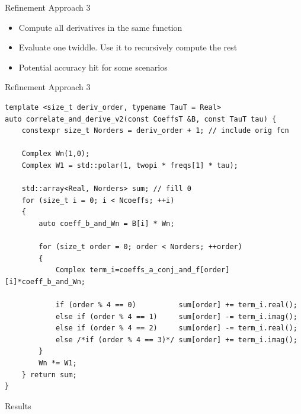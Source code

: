 \begin{frame}{Refinement Approach 3}
	\begin{itemize}
		\item Compute all derivatives in the same function
		\item Evaluate one twiddle. Use it to recursively compute the rest
		\item Potential accuracy hit for some scenarios 
	\end{itemize}
\end{frame}


\begin{frame}[fragile]{Refinement Approach 3}
	\begin{lstlisting}[basicstyle=\ttfamily\scriptsize, 
		linebackgroundcolor={%
			\ifnum\value{lstnumber}=5 \color{yellow!30}\fi
			\ifnum\value{lstnumber}=6 \color{yellow!30}\fi
			\ifnum\value{lstnumber}=15 \color{yellow!30}\fi
			\ifnum\value{lstnumber}=22 \color{yellow!30}\fi
		}]
template <size_t deriv_order, typename TauT = Real>
auto correlate_and_derive_v2(const CoeffsT &B, const TauT tau) {
	constexpr size_t Norders = deriv_order + 1; // include orig fcn
	
	Complex Wn(1,0);
	Complex W1 = std::polar(1, twopi * freqs[1] * tau);
	
	std::array<Real, Norders> sum; // fill 0
	for (size_t i = 0; i < Ncoeffs; ++i)
	{
		auto coeff_b_and_Wn = B[i] * Wn;
		
		for (size_t order = 0; order < Norders; ++order)
		{
			Complex term_i=coeffs_a_conj_and_f[order][i]*coeff_b_and_Wn;
			
			if (order % 4 == 0)          sum[order] += term_i.real();
			else if (order % 4 == 1)     sum[order] -= term_i.imag();
			else if (order % 4 == 2)     sum[order] -= term_i.real();
			else /*if (order % 4 == 3)*/ sum[order] += term_i.imag();
		}
		Wn *= W1;
	} return sum;
}
	\end{lstlisting}
	
\end{frame}


\begin{frame}{Results}
\end{frame}




